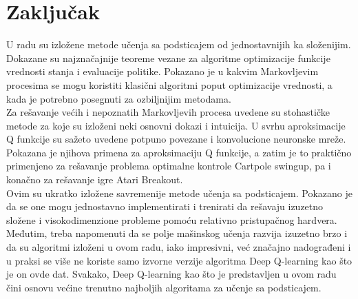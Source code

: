 \documentclass[a4paper,fleqn,12pt]{JMThesis}
\theoremstyle{plain}
\theoremstyle{definition}
\theoremstyle{definition}
\begin{document}
\chapter{Zaključak}
U radu su izložene metode učenja sa podsticajem od jednostavnijih ka složenijim. Dokazane su najznačajnije teoreme vezane za algoritme
optimizacije funkcije vrednosti stanja i evaluacije politike. Pokazano je u kakvim Markovljevim procesima se mogu
koristiti klasični algoritmi poput optimizacije vrednosti, a kada je potrebno posegnuti za ozbiljnijim metodama. \\
Za rešavanje većih i nepoznatih Markovljevih procesa uvedene su stohastičke metode za koje su izloženi neki osnovni dokazi i intuicija.
U svrhu aproksimacije Q funkcije su sažeto uvedene potpuno povezane i konvolucione neuronske mreže. Pokazana je njihova primena
za aproksimaciju Q funkcije, a zatim je to praktično primenjeno za rešavanje problema optimalne kontrole Cartpole swingup, pa i
konačno za rešavanje igre Atari Breakout.\\
Ovim su ukratko izložene savremenije metode učenja sa podsticajem. Pokazano je da se one mogu jednostavno implementirati
i trenirati da rešavaju izuzetno složene i visokodimenzione probleme pomoću relativno pristupačnog hardvera. Međutim, treba
napomenuti da se polje mašinskog učenja razvija izuzetno brzo i da su algoritmi izloženi u ovom radu, iako impresivni, već
značajno nadograđeni i u praksi se više ne koriste samo izvorne verzije algoritma Deep Q-learning kao što je on ovde dat.
Svakako, Deep Q-learning kao što je predstavljen u ovom radu čini osnovu većine trenutno najboljih algoritama za učenje sa podsticajem.
\printbibliography[title=Literatura]
\end{document}
